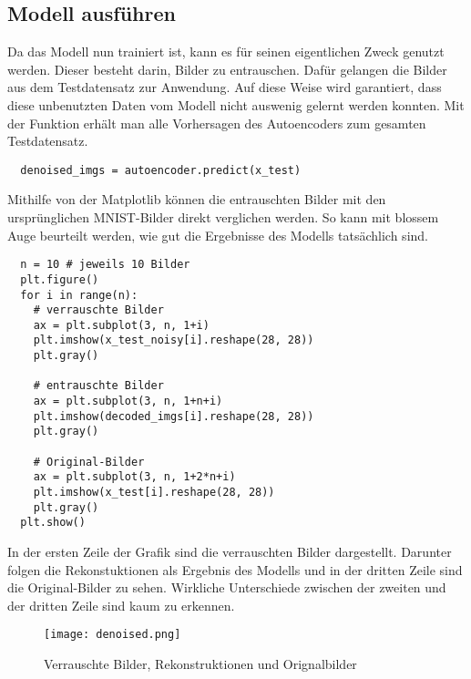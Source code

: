 \subsection{Modell ausführen}
Da das Modell nun trainiert ist, kann es für seinen eigentlichen Zweck
genutzt werden.
Dieser besteht darin, Bilder zu entrauschen. Dafür gelangen die
Bilder aus dem Testdatensatz zur Anwendung. Auf diese Weise wird garantiert, dass diese
unbenutzten Daten vom Modell nicht auswenig gelernt werden konnten.
Mit der Funktion 
erhält man alle Vorhersagen des Autoencoders zum gesamten Testdatensatz.
\begin{verbatim}
  denoised_imgs = autoencoder.predict(x_test)
\end{verbatim}
Mithilfe von der Matplotlib können die entrauschten Bilder mit den
ursprünglichen MNIST-Bilder direkt verglichen werden.
So kann mit blossem Auge beurteilt werden, wie gut die Ergebnisse des Modells tatsächlich sind.
\begin{verbatim}
  n = 10 # jeweils 10 Bilder
  plt.figure()
  for i in range(n):
    # verrauschte Bilder
    ax = plt.subplot(3, n, 1+i)
    plt.imshow(x_test_noisy[i].reshape(28, 28))
    plt.gray()

    # entrauschte Bilder
    ax = plt.subplot(3, n, 1+n+i)
    plt.imshow(decoded_imgs[i].reshape(28, 28))
    plt.gray()

    # Original-Bilder
    ax = plt.subplot(3, n, 1+2*n+i)
    plt.imshow(x_test[i].reshape(28, 28))
    plt.gray()
  plt.show()
\end{verbatim}
In der ersten Zeile der Grafik sind die verrauschten Bilder dargestellt.
Darunter folgen die Rekonstuktionen als Ergebnis des Modells und in der dritten Zeile
sind die Original-Bilder zu sehen.
Wirkliche Unterschiede zwischen der zweiten und der dritten Zeile sind kaum zu erkennen.
\begin{figure}[h!]
  \centering
  \texttt{[image: denoised.png]}
  \caption{Verrauschte Bilder, Rekonstruktionen und Orignalbilder}
\end{figure}

